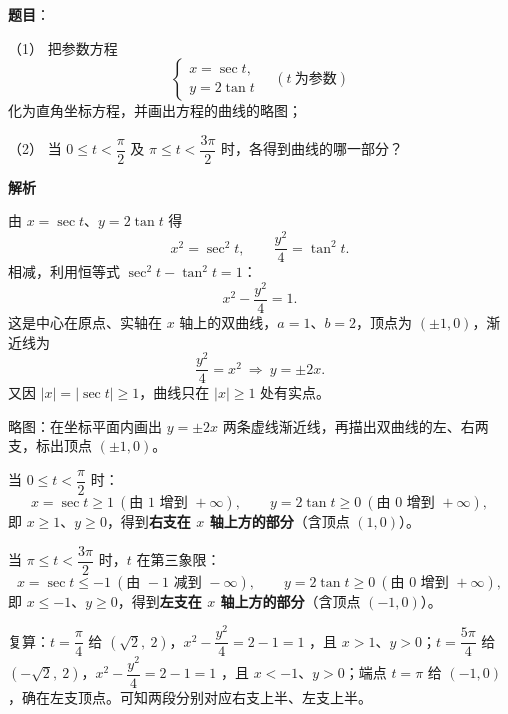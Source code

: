 \begin{answer}

\textbf{题目}：

（1） 把参数方程
\nopagebreak[4]
\[
\begin{cases}
x=\sec t,\\
y=2\tan t
\end{cases}
\quad(t\ \text{为参数})
\]
化为直角坐标方程，并画出方程的曲线的略图；

（2） 当 $0\le t<\dfrac{\pi}{2}$ 及 $\pi\le t<\dfrac{3\pi}{2}$ 时，各得到曲线的哪一部分？

\textbf{解析}


由 $x=\sec t$、$y=2\tan t$ 得
\nopagebreak[4]
\[
x^2=\sec^2t,\qquad \frac{y^2}{4}=\tan^2t.
\]
相减，利用恒等式 $\sec^2t-\tan^2t=1$：
\nopagebreak[4]
\[
x^2-\frac{y^2}{4}=1.
\]
这是中心在原点、实轴在 $x$ 轴上的双曲线，$a=1$、$b=2$，顶点为 $(\pm1,0)$，渐近线为
\nopagebreak[4]
\[
\frac{y^2}{4}=x^2\ \Longrightarrow\ y=\pm2x.
\]
又因 $|x|=|\sec t|\ge1$，曲线只在 $|x|\ge1$ 处有实点。

略图：在坐标平面内画出 $y=\pm2x$ 两条虚线渐近线，再描出双曲线的左、右两支，标出顶点 $(\pm1,0)$。


当 $0\le t<\dfrac{\pi}{2}$ 时：
\nopagebreak[4]
\[
x=\sec t\ge1\ (\text{由 }1\text{ 增到 }+\infty),\qquad y=2\tan t\ge0\ (\text{由 }0\text{ 增到 }+\infty),
\]
即 $x\ge1$、$y\ge0$，得到\textbf{右支在 $x$ 轴上方的部分}（含顶点 $(1,0)$）。

当 $\pi\le t<\dfrac{3\pi}{2}$ 时，$t$ 在第三象限：
\nopagebreak[4]
\[
x=\sec t\le-1\ (\text{由 }-1\text{ 减到 }-\infty),\qquad y=2\tan t\ge0\ (\text{由 }0\text{ 增到 }+\infty),
\]
即 $x\le-1$、$y\ge0$，得到\textbf{左支在 $x$ 轴上方的部分}（含顶点 $(-1,0)$）。

复算：$t=\dfrac{\pi}{4}$ 给 $\left(\sqrt2,\ 2\right)$，$x^2-\dfrac{y^2}{4}=2-1=1$ ，且 $x>1$、$y>0$；$t=\dfrac{5\pi}{4}$ 给 $\left(-\sqrt2,\ 2\right)$，$x^2-\dfrac{y^2}{4}=2-1=1$ ，且 $x<-1$、$y>0$；端点 $t=\pi$ 给 $(-1,0)$，确在左支顶点。可知两段分别对应右支上半、左支上半。



\end{answer}